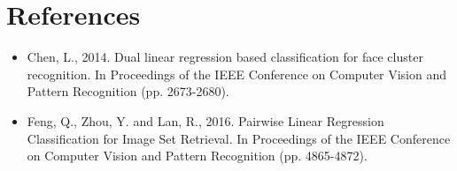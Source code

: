 \documentclass[a4paper]{article}
\begin{document}
				
	\section{References}
	\begin{itemize}
		\item Chen, L., 2014. Dual linear regression based classification for face cluster recognition. In Proceedings of the IEEE Conference on Computer Vision and Pattern Recognition (pp. 2673-2680).
		
		\item Feng, Q., Zhou, Y. and Lan, R., 2016. Pairwise Linear Regression Classification for Image Set Retrieval. In Proceedings of the IEEE Conference on Computer Vision and Pattern Recognition (pp. 4865-4872).
		

	\end{itemize}
	
	
\end{document}
